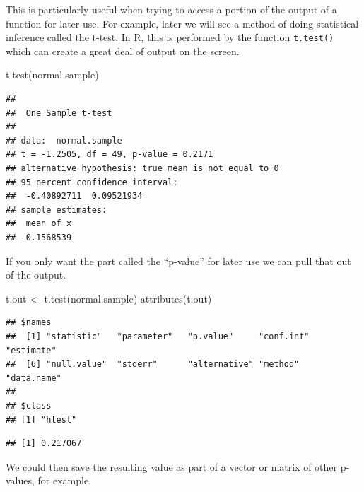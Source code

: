 \documentclass[
]{book}
\newenvironment{Shaded}{\begin{snugshade}}{\end{snugshade}}
\newcommand{\FunctionTok}[1]{\textcolor[rgb]{0.00,0.00,0.00}{#1}}
\newcommand{\NormalTok}[1]{#1}
\newcommand{\OtherTok}[1]{\textcolor[rgb]{0.56,0.35,0.01}{#1}}
\newcommand{\SpecialCharTok}[1]{\textcolor[rgb]{0.00,0.00,0.00}{#1}}
\begin{document}
This is particularly useful when trying to access a portion of the output of a function for later use. For example, later we will see a method of doing statistical inference called the t-test. In R, this is performed by the function \texttt{t.test()} which can create a great deal of output on the screen.

\begin{Shaded}
\begin{Highlighting}[]
\FunctionTok{t.test}\NormalTok{(normal.sample)}
\end{Highlighting}
\end{Shaded}

\begin{verbatim}
## 
##  One Sample t-test
## 
## data:  normal.sample
## t = -1.2505, df = 49, p-value = 0.2171
## alternative hypothesis: true mean is not equal to 0
## 95 percent confidence interval:
##  -0.40892711  0.09521934
## sample estimates:
##  mean of x 
## -0.1568539
\end{verbatim}

If you only want the part called the ``p-value'' for later use we can pull that out of the output.

\begin{Shaded}
\begin{Highlighting}[]
\NormalTok{t.out }\OtherTok{\textless{}{-}} \FunctionTok{t.test}\NormalTok{(normal.sample)}
\FunctionTok{attributes}\NormalTok{(t.out)}
\end{Highlighting}
\end{Shaded}

\begin{verbatim}
## $names
##  [1] "statistic"   "parameter"   "p.value"     "conf.int"    "estimate"   
##  [6] "null.value"  "stderr"      "alternative" "method"      "data.name"  
## 
## $class
## [1] "htest"
\end{verbatim}

\begin{Shaded}
\end{Shaded}

\begin{verbatim}
## [1] 0.217067
\end{verbatim}

We could then save the resulting value as part of a vector or matrix of other p-values, for example.
\end{document}
